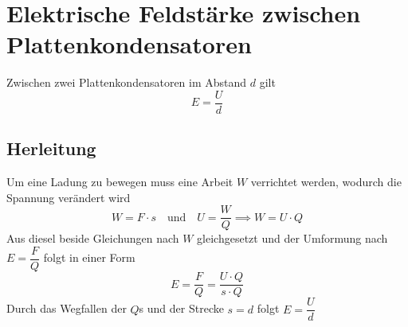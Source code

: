\documentclass{article}
\begin{document}
 
\section{Elektrische Feldstärke zwischen Plattenkondensatoren} 
Zwischen zwei Plattenkondensatoren im Abstand $d$ gilt
\[
 E=\frac{U}{d} 
\]
 
\subsection{Herleitung}
Um eine Ladung zu bewegen muss eine Arbeit $W$ verrichtet werden, wodurch die Spannung verändert wird
\[
 W=F \cdot s
 \quad \text{und} \quad 
 U = \frac{W}{Q} \implies W = U \cdot Q 
\]
Aus diesel beside Gleichungen nach $W$ gleichgesetzt und der Umformung nach $E = \dfrac{F}{Q}$ folgt in einer Form
\[
  E = \frac{F}{Q} = \frac{U \cdot Q}{s \cdot Q}
\]
Durch das Wegfallen der $Q$s und der Strecke $s=d$ folgt $E = \dfrac{U}{d}$
\end{document}
